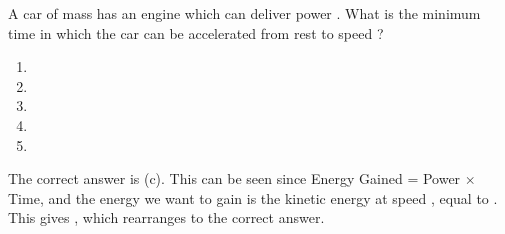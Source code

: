 
\begin{problem} 
{A car of mass  has an engine which can deliver power . What is the minimum time in which the car can be accelerated from rest to speed ?
\begin{enumerate}
	\item {}
	\item {}
	\item {}\answer
	\item {}
	\item {}
\end{enumerate}}
{}
{The correct answer is (c). This can be seen since Energy Gained = Power $\times$ Time, and the energy we want to gain is the kinetic energy at speed , equal to . This gives , which rearranges to the correct answer.}
\end{problem}